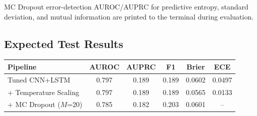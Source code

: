 \documentclass[11pt]{article}
\begin{document}
MC Dropout error-detection AUROC/AUPRC for predictive entropy, standard deviation, and mutual information are printed to the terminal during evaluation.

\subsection{Expected Test Results}

\begin{table}[h]
\centering
\begin{tabular}{lccccc}
\toprule
Pipeline & AUROC & AUPRC & F1 & Brier & ECE \\
\midrule
Tuned CNN+LSTM & 0.797 & 0.189 & 0.189 & 0.0602 & 0.0497 \\
+ Temperature Scaling & 0.797 & 0.189 & 0.189 & 0.0565 & 0.0133 \\
+ MC Dropout ($M$=20) & 0.785 & 0.182 & 0.203 & 0.0601 & -- \\
\bottomrule
\end{tabular}
\end{table}
\end{document}
